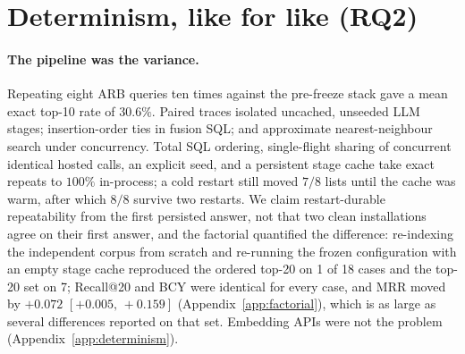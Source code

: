 \documentclass{article}
\newcommand{\ci}[2]{{\footnotesize$[#1,\,#2]$}}
\newcommand{\system}{Delphi}
\begin{document}
\section{Determinism, like for like (RQ2)}
\label{sec:determinism}

\paragraph{The pipeline was the variance.} Repeating eight ARB queries ten times against the pre-freeze stack gave a mean exact top-10 rate of $30.6\%$. Paired traces isolated uncached, unseeded LLM stages; insertion-order ties in fusion SQL; and approximate nearest-neighbour search under concurrency. Total SQL ordering, single-flight sharing of concurrent identical hosted calls, an explicit seed, and a persistent stage cache take exact repeats to $100\%$ in-process; a cold restart still moved $7/8$ lists until the cache was warm, after which $8/8$ survive two restarts. We claim restart-durable repeatability from the first persisted answer, not that two clean installations agree on their first answer, and the factorial quantified the difference: re-indexing the independent corpus from scratch and re-running the frozen configuration with an empty stage cache reproduced the ordered top-20 on 1 of 18 cases and the top-20 set on 7; Recall@20 and BCY were identical for every case, and MRR moved by $+0.072$ \ci{+0.005}{+0.159} (Appendix~\ref{app:factorial}), which is as large as several differences reported on that set. Embedding APIs were not the problem (Appendix~\ref{app:determinism}).

\begin{table}[t]
\centering
\caption{Like-for-like repeatability on ten documentation cases $\times$ ten runs (450 run pairs per engine). Retrieved-set columns use each engine's \emph{observable} retrieval unit---retrieved chunks for \system{} and the documentation engine, the set of cited URLs for the synthesis engine---and are therefore not directly comparable across engines: a stable URL set does not imply that the same passages were selected from those pages. Byte-exact is the delivered context text; hit agreement is whether the identifier-hit outcome agreed across the pair.}
\label{tab:determinism}
\small
\setlength{\tabcolsep}{4pt}
\resizebox{\textwidth}{!}{}
\end{table}
\end{document}
